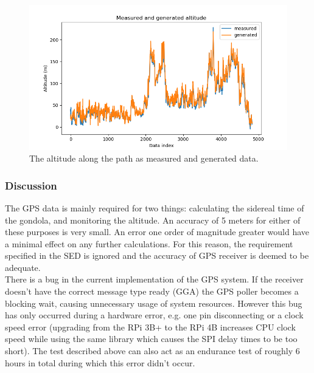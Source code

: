 \begin{figure}[H]
	\includegraphics[width=\textwidth]{appendix/img/test-results/gps_alt_plot.png}
	\caption{The altitude along the path as measured and generated data.}
	\label{alt_plot}
\end{figure}

\subsubsection*{Discussion}

The GPS data is mainly required for two things: calculating the sidereal time of the gondola, and monitoring the altitude. An accuracy of 5 meters for either of these purposes is very small. An error one order of magnitude greater would have a minimal effect on any further calculations. For this reason, the requirement specified in the SED is ignored and the accuracy of GPS receiver is deemed to be adequate.\\

There is a bug in the current implementation of the GPS system. If the receiver doesn't have the correct message type ready (GGA) the GPS poller becomes a blocking wait, causing unnecessary usage of system resources. However this bug has only occurred during a hardware error, e.g. one pin disconnecting or a clock speed error (upgrading from the RPi 3B+ to the RPi 4B increases CPU clock speed while using the same library which causes the SPI delay times to be too short). The test described above can also act as an endurance test of roughly 6 hours in total during which this error didn't occur.